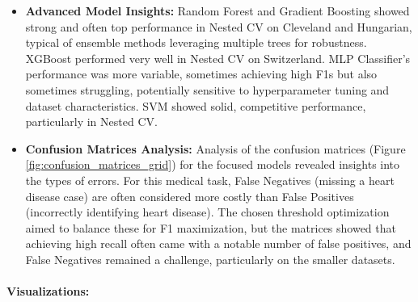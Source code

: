 \documentclass{article}
\begin{document}
\begin{itemize}
    \item \textbf{Advanced Model Insights:} Random Forest and Gradient Boosting showed strong and often top performance in Nested CV on Cleveland and Hungarian, typical of ensemble methods leveraging multiple trees for robustness. XGBoost performed very well in Nested CV on Switzerland. MLP Classifier's performance was more variable, sometimes achieving high F1s but also sometimes struggling, potentially sensitive to hyperparameter tuning and dataset characteristics. SVM showed solid, competitive performance, particularly in Nested CV.
    \item \textbf{Confusion Matrices Analysis:} Analysis of the confusion matrices (Figure \ref{fig:confusion_matrices_grid}) for the focused models revealed insights into the types of errors. For this medical task, False Negatives (missing a heart disease case) are often considered more costly than False Positives (incorrectly identifying heart disease). The chosen threshold optimization aimed to balance these for F1 maximization, but the matrices showed that achieving high recall often came with a notable number of false positives, and False Negatives remained a challenge, particularly on the smaller datasets.
\end{itemize}

\paragraph{Visualizations:}

\end{document}
